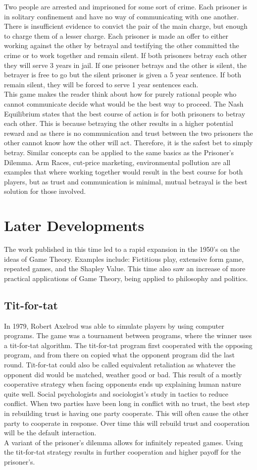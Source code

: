 \documentclass[12pt]{article}
\begin{document}
 		Two people are arrested and imprisoned for some sort of crime. Each prisoner is in solitary confinement and have no way of communicating with one another. There is insufficient evidence to convict the pair of the main charge, but enough to charge them of a lesser charge. Each prisoner is made an offer to either working against the other by betrayal and testifying the other committed the crime or to work together and remain silent. If both prisoners betray each other they will serve 3 years in jail. If one prisoner betrays and the other is silent, the betrayer is free to go but the silent prisoner is given a 5 year sentence. If both remain silent, they will be forced to serve 1 year sentences each.\\
 	This game makes the reader think about how for purely rational people who cannot communicate decide what would be the best way to proceed.
 	The Nash Equilibrium states that the best course of action is for both prisoners to betray each other. This is because betraying the other results in a higher potential reward and as there is no communication and trust between the two prisoners the other cannot know how the other will act. Therefore, it is the safest bet to simply betray. Similar concepts can be applied to the same basics as the Prisoner's Dilemma. Arm Races, cut-price marketing, environmental pollution are all examples that where working together would result in the best course for both players, but as trust and communication is minimal, mutual betrayal is the best solution for those involved.  
 	\section{Later Developments}
 	The work published in this time led to a rapid expansion in the 1950's on the ideas of Game Theory. Examples include: Fictitious play, extensive form game, repeated games, and the Shapley Value.  This time also saw an increase of more practical applications of Game Theory, being applied to philosophy and politics.
 	\subsection{Tit-for-tat}
 	 In 1979, Robert Axelrod was able to simulate players by using computer programs. The game was a tournament between programs, where the winner uses a tit-for-tat algorithm. The tit-for-tat program first cooperated with the opposing program, and from there on copied what the opponent program did the last round. Tit-for-tat could also be called equivalent retaliation as whatever the opponent did would be matched, weather good or bad. This result of a mostly cooperative strategy when facing opponents ends up explaining human nature quite well. Social psychologists and sociologist's study in tactics to reduce conflict. When two parties have been long in conflict with no trust, the best step in rebuilding trust is having one party cooperate. This will often cause the other party to cooperate in response. Over time this will rebuild trust and cooperation will be the default interaction. \\
 	 A variant of the prisoner's dilemma allows for infinitely repeated games. Using the tit-for-tat strategy results in further cooperation and higher payoff for the prisoner's. 
\end{document}
